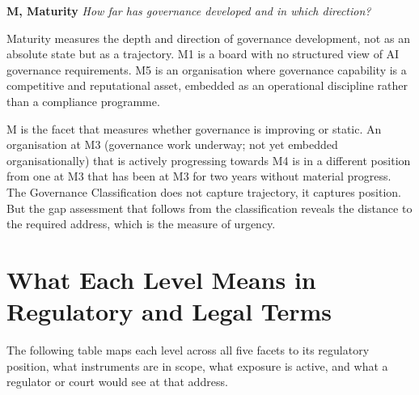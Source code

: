 \textbf{M, Maturity} \emph{How far has governance developed and in which direction?}

Maturity measures the depth and direction of governance development, not as an absolute state but as a trajectory. M1 is a board with no structured view of AI governance requirements. M5 is an organisation where governance capability is a competitive and reputational asset, embedded as an operational discipline rather than a compliance programme.

M is the facet that measures whether governance is improving or static. An organisation at M3 (governance work underway; not yet embedded organisationally) that is actively progressing towards M4 is in a different position from one at M3 that has been at M3 for two years without material progress. The Governance Classification does not capture trajectory, it captures position. But the gap assessment that follows from the classification reveals the distance to the required address, which is the measure of urgency.

\scenebreak

\section{What Each Level Means in Regulatory and Legal Terms}

The following table maps each level across all five facets to its regulatory position, what instruments are in scope, what exposure is active, and what a regulator or court would see at that address.


